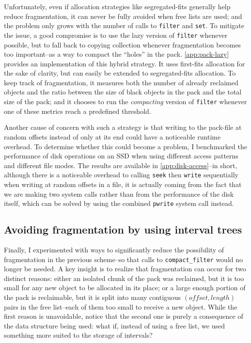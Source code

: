 Unfortunately, even if allocation strategies like segregated-fits generally help reduce fragmentation, it can never be fully avoided when free lists are used; and the problem only grows with the number of calls to \texttt{filter} and \texttt{set}. To mitigate the issue, a good compromise is to use the lazy version of \texttt{filter} whenever possible, but to fall back to copying collection whenever fragmentation becomes too important--as a way to compact the ``holes'' in the pack. \cref{app:pack-lazy} provides an implementation of this hybrid strategy. It uses first-fits allocation for the sake of clarity, but can easily be extended to segregated-fits allocation. To keep track of fragmentation, it measures both the number of already reclaimed objects and the ratio between the size of black objects in the pack and the total size of the pack; and it chooses to run the \emph{compacting} version of \texttt{filter} whenever one of these metrics reach a predefined threshold.

Another cause of concern with such a strategy is that writing to the pack-file at random offsets instead of only at its end could have a noticeable runtime overhead. To determine whether this could become a problem, I benchmarked the performance of disk operations on an SSD when using different access patterns and different file modes. The results are available in \cref{app:disk-access}--in short, although there is a noticeable overhead to calling \texttt{seek} then \texttt{write} sequentially when writing at random offsets in a file, it is actually coming from the fact that we are making two system calls rather than from the performance of the disk itself, which can be solved by using the combined \texttt{pwrite} system call instead.

\subsection{Avoiding fragmentation by using interval trees}

Finally, I experimented with ways to significantly reduce the possibility of fragmentation in the previous scheme--so that calls to \texttt{compact\_filter} would no longer be needed. A key insight is to realize that fragmentation can occur for two distinct reasons: either an isolated chunk of the pack was reclaimed, but it is too small for any new object to be allocated in its place; or a large enough portion of the pack is reclaimable, but it is split into many contiguous \((offset, length)\) pairs in the free list--each of them too small to receive a new object. While the first reason is unavoidable, notice that the second one is purely a consequence of the data structure being used: what if, instead of using a free list, we used something more suited to the storage of intervals?

